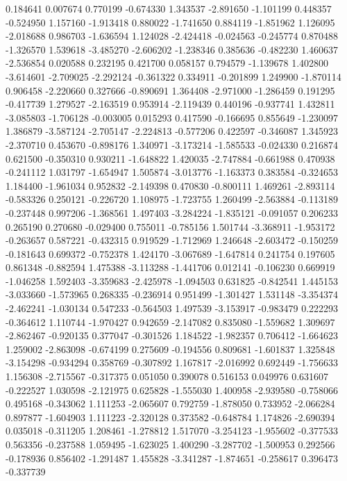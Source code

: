0.184641
0.007674
0.770199
-0.674330
1.343537
-2.891650
-1.101199
0.448357
-0.524950
1.157160
-1.913418
0.880022
-1.741650
0.884119
-1.851962
1.126095
-2.018688
0.986703
-1.636594
1.124028
-2.424418
-0.024563
-0.245774
0.870488
-1.326570
1.539618
-3.485270
-2.606202
-1.238346
0.385636
-0.482230
1.460637
-2.536854
0.020588
0.232195
0.421700
0.058157
0.794579
-1.139678
1.402800
-3.614601
-2.709025
-2.292124
-0.361322
0.334911
-0.201899
1.249900
-1.870114
0.906458
-2.220660
0.327666
-0.890691
1.364408
-2.971000
-1.286459
0.191295
-0.417739
1.279527
-2.163519
0.953914
-2.119439
0.440196
-0.937741
1.432811
-3.085803
-1.706128
-0.003005
0.015293
0.417590
-0.166695
0.855649
-1.230097
1.386879
-3.587124
-2.705147
-2.224813
-0.577206
0.422597
-0.346087
1.345923
-2.370710
0.453670
-0.898176
1.340971
-3.173214
-1.585533
-0.024330
0.216874
0.621500
-0.350310
0.930211
-1.648822
1.420035
-2.747884
-0.661988
0.470938
-0.241112
1.031797
-1.654947
1.505874
-3.013776
-1.163373
0.383584
-0.324653
1.184400
-1.961034
0.952832
-2.149398
0.470830
-0.800111
1.469261
-2.893114
-0.583326
0.250121
-0.226720
1.108975
-1.723755
1.260499
-2.563884
-0.113189
-0.237448
0.997206
-1.368561
1.497403
-3.284224
-1.835121
-0.091057
0.206233
0.265190
0.270680
-0.029400
0.755011
-0.785156
1.501744
-3.368911
-1.953172
-0.263657
0.587221
-0.432315
0.919529
-1.712969
1.246648
-2.603472
-0.150259
-0.181643
0.699372
-0.752378
1.424170
-3.067689
-1.647814
0.241754
0.197605
0.861348
-0.882594
1.475388
-3.113288
-1.441706
0.012141
-0.106230
0.669919
-1.046258
1.592403
-3.359683
-2.425978
-1.094503
0.631825
-0.842541
1.445153
-3.033660
-1.573965
0.268335
-0.236914
0.951499
-1.301427
1.531148
-3.354374
-2.462241
-1.030134
0.547233
-0.564503
1.497539
-3.153917
-0.983479
0.222293
-0.364612
1.110744
-1.970427
0.942659
-2.147082
0.835080
-1.559682
1.309697
-2.862467
-0.920135
0.377047
-0.301526
1.184522
-1.982357
0.706412
-1.664623
1.259002
-2.863098
-0.674199
0.275609
-0.194556
0.809681
-1.601837
1.325848
-3.154298
-0.934294
0.358769
-0.307892
1.167817
-2.016992
0.692449
-1.756633
1.156308
-2.715567
-0.317375
0.051050
0.390078
0.516153
0.049976
0.631607
-0.222527
1.030598
-2.121975
0.625828
-1.555030
1.400958
-2.939580
-0.758066
0.495168
-0.343062
1.111253
-2.065607
0.792759
-1.878050
0.733952
-2.066284
0.897877
-1.604903
1.111223
-2.320128
0.373582
-0.648784
1.174826
-2.690394
0.035018
-0.311205
1.208461
-1.278812
1.517070
-3.254123
-1.955602
-0.377533
0.563356
-0.237588
1.059495
-1.623025
1.400290
-3.287702
-1.500953
0.292566
-0.178936
0.856402
-1.291487
1.455828
-3.341287
-1.874651
-0.258617
0.396473
-0.337739
